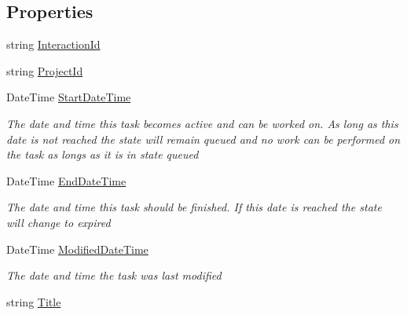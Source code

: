 \subsection*{Properties}
\begin{DoxyCompactItemize}
\item 
string \hyperlink{class_plex_byte_1_1_mo_cap_1_1_interactions_1_1_task_a1e0a8c220a72fc6189fa7081e6279a67}{Interaction\+Id}
\item 
string \hyperlink{class_plex_byte_1_1_mo_cap_1_1_interactions_1_1_task_a5827bb9ca244149e76780756ce196057}{Project\+Id}
\item 
Date\+Time \hyperlink{class_plex_byte_1_1_mo_cap_1_1_interactions_1_1_task_a3b4287e83b9825d68a583ad68ec60b65}{Start\+Date\+Time}
\begin{DoxyCompactList}\small\item\em The date and time this task becomes active and can be worked on. As long as this date is not reached the state will remain queued and no work can be performed on the task as longs as it is in state queued \end{DoxyCompactList}\item 
Date\+Time \hyperlink{class_plex_byte_1_1_mo_cap_1_1_interactions_1_1_task_a7855e576032a285a50f918098e030c7f}{End\+Date\+Time}
\begin{DoxyCompactList}\small\item\em The date and time this task should be finished. If this date is reached the state will change to expired \end{DoxyCompactList}\item 
Date\+Time \hyperlink{class_plex_byte_1_1_mo_cap_1_1_interactions_1_1_task_aea629926c184e80ae57914422f5fcb4c}{Modified\+Date\+Time}
\begin{DoxyCompactList}\small\item\em The date and time the task was last modified \end{DoxyCompactList}\item 
string \hyperlink{class_plex_byte_1_1_mo_cap_1_1_interactions_1_1_task_afc2aa1b0a8699fe0a607b452eb5461c3}{Title}

\end{DoxyCompactItemize}
